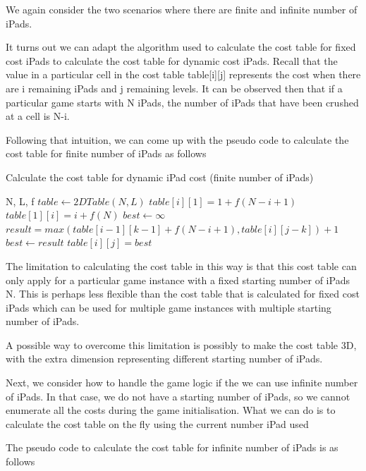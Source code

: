 \documentclass[12pt,a4paper,oneside]{report}
\begin{document}
We again consider the two scenarios where there are finite and infinite number of iPads.

It turns out we can adapt the algorithm used to calculate the cost table for fixed cost iPads to calculate the cost table for dynamic cost iPads. Recall that the value in a particular cell in the cost table table[i][j] represents the cost when there are i remaining iPads and j remaining levels. It can be observed then that if a particular game starts with N iPads, the number of iPads that have been crushed at a cell is N-i.

Following that intuition, we can come up with the pseudo code to calculate the cost table for finite number of iPads as follows

\begin{algorithm}[H]
\caption{Calculate the cost table for dynamic iPad cost (finite number of iPads)}
\begin{algorithmic}[1]
\REQUIRE N, L, f
\STATE $table \leftarrow 2DTable(N, L)$
	\STATE $table[i][1] = 1 + f(N-i+1)$
\ENDFOR
{}
	\STATE $table[1][i] = i + f(N)$
\ENDFOR
{}
		\STATE $best \leftarrow \infty$
			\STATE $result = max(table[i - 1][k - 1] + f(N-i+1), table[i][j - k]) + 1$
				\STATE $best \leftarrow result$
			\ENDIF
		\ENDFOR
		\STATE $table[i][j] = best$
	\ENDFOR
\ENDFOR
\end{algorithmic}
\end{algorithm}

The limitation to calculating the cost table in this way is that this cost table can only apply for a particular game instance with a fixed starting number of iPads N. This is perhaps less flexible than the cost table that is calculated for fixed cost iPads which can be used for multiple game instances with multiple starting number of iPads.

A possible way to overcome this limitation is possibly to make the cost table 3D, with the extra dimension representing different starting number of iPads.

Next, we consider how to handle the game logic if the we can use infinite number of iPads. In that case, we do not have a starting number of iPads, so we cannot enumerate all the costs during the game initialisation. What we can do is to calculate the cost table on the fly using the current number iPad used 

The pseudo code to calculate the cost table for infinite number of iPads is as follows
\end{document}
